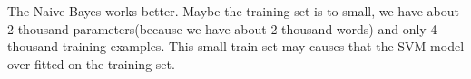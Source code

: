 \begin{answer}
The Naive Bayes works better. Maybe the training set is to small, we have about 2 thousand parameters(because we have about 2 thousand words) and only 4 thousand training examples. This small train set may causes that the SVM model over-fitted on the training set.
\end{answer}